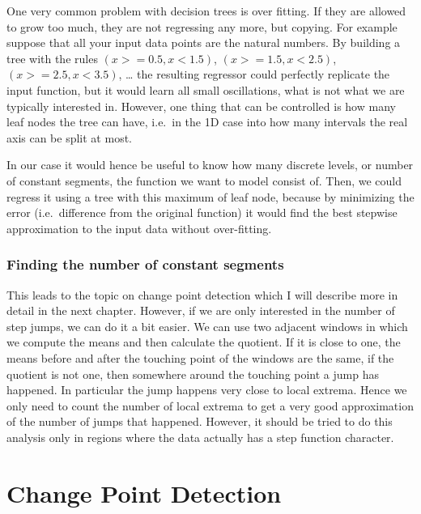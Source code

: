 \documentclass[12pt,a4paper]{article}
\begin{document}
One very common problem with decision trees is over fitting. If they are allowed to grow too much, they are not regressing any more, but copying. For example suppose that all your input data points are the natural numbers. By building a tree with the rules \((x >= 0.5, x <1.5)\), \((x >= 1.5, x <2.5)\), \((x >= 2.5, x <3.5)\), \ldots{} the resulting regressor could perfectly replicate the input function, but it would learn all small oscillations, what is not what we are typically interested in. However, one thing that can be controlled is how many leaf nodes the tree can have, i.e.~in the 1D case into how many intervals the real axis can be split at most.

In our case it would hence be useful to know how many discrete levels, or number of constant segments, the function we want to model consist of. Then, we could regress it using a tree with this maximum of leaf node, because by minimizing the error (i.e.~difference from the original function) it would find the best stepwise approximation to the input data without over-fitting.

\hypertarget{finding-the-number-of-constant-segments}{%
\subsubsection{Finding the number of constant segments}\label{finding-the-number-of-constant-segments}}

This leads to the topic on change point detection which I will describe more in detail in the next chapter. However, if we are only interested in the number of step jumps, we can do it a bit easier. We can use two adjacent windows in which we compute the means and then calculate the quotient. If it is close to one, the means before and after the touching point of the windows are the same, if the quotient is not one, then somewhere around the touching point a jump has happened. In particular the jump happens very close to local extrema. Hence we only need to count the number of local extrema to get a very good approximation of the number of jumps that happened. However, it should be tried to do this analysis only in regions where the data actually has a step function character.

\hypertarget{change-point-detection}{%
\section{Change Point Detection}\label{change-point-detection}}
\end{document}
